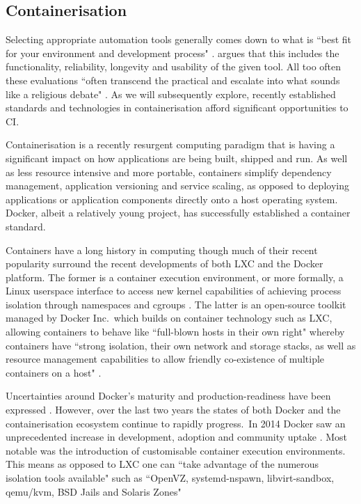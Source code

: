 \documentclass[journal]{IEEEtran}
\begin{document}
\subsection{Containerisation}
Selecting appropriate automation tools
generally comes down to what is ``best fit for your
environment and development process" \citep{Duvall}. 
\citet{Duvall} argues that this includes the functionality, reliability, longevity and 
usability of the given tool. All too often these
evaluations ``often transcend the practical and 
escalate into what sounds like a religious debate" \citet{Duvall}. 
As we will subsequently explore, recently established 
standards and technologies in containerisation 
afford significant opportunities to CI.
\par
Containerisation is a recently resurgent computing paradigm that is
having a significant impact on how applications are being built,
shipped and run. As well as less resource intensive and
more portable, containers simplify dependency management, application
versioning and service scaling, as opposed to deploying
applications or application components directly onto a host operating
system. Docker, albeit a relatively young project, has successfully
established a container standard.
\par
Containers have a long history in computing though much of their recent popularity 
surround the recent developments of both LXC and the Docker platform. 
The former is a container execution environment,
or more formally, a Linux userspace interface to 
access new kernel capabilities of achieving process isolation through namespaces
and cgroups \citep{Claus}. The latter is an open-source toolkit managed by Docker Inc.\ which
builds on container technology such as LXC, 
allowing containers to behave like ``full-blown hosts in their own right" 
whereby containers have ``strong isolation, their own network and storage stacks, as well 
as resource management capabilities to allow friendly co-existence of multiple containers on a host" \citep{db}.
\par 
Uncertainties around Docker's maturity and production-readiness have been expressed \citep{Kereki, Powers, Merkel}.
However, over the last two years the states of both Docker and the containerisation ecosystem continue to rapidly progress.\
In 2014 Docker saw an unprecedented increase in development, adoption and community uptake \citep{Merkel}. Most
notable was the introduction of customisable container execution environments. This means as opposed to LXC one can
``take advantage of the numerous isolation tools available" such as ``OpenVZ, systemd-nspawn, libvirt-sandbox, qemu/kvm, BSD Jails and Solaris Zones"
\end{document}
